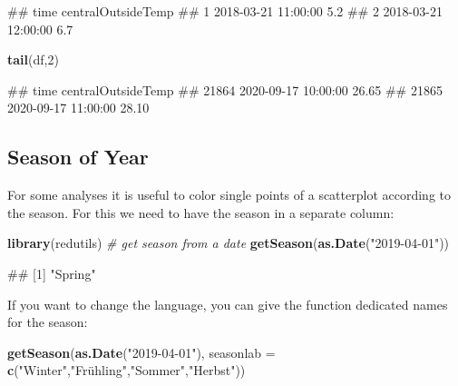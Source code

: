 \documentclass[
]{book}
\newenvironment{Shaded}{\begin{snugshade}}{\end{snugshade}}
\newcommand{\CommentTok}[1]{\textcolor[rgb]{0.56,0.35,0.01}{\textit{#1}}}
\newcommand{\DataTypeTok}[1]{\textcolor[rgb]{0.13,0.29,0.53}{#1}}
\newcommand{\DecValTok}[1]{\textcolor[rgb]{0.00,0.00,0.81}{#1}}
\newcommand{\KeywordTok}[1]{\textcolor[rgb]{0.13,0.29,0.53}{\textbf{#1}}}
\newcommand{\NormalTok}[1]{#1}
\newcommand{\StringTok}[1]{\textcolor[rgb]{0.31,0.60,0.02}{#1}}
\let\oldShaded\Shaded
\let\endoldShaded\endShaded
\renewenvironment{Shaded}{\footnotesize\oldShaded}{\endoldShaded}
\let\oldverbatim\verbatim
\let\endoldverbatim\endverbatim
\renewenvironment{verbatim}{\footnotesize\oldverbatim}{\endoldverbatim}
\begin{document}
\begin{verbatim}
##                  time centralOutsideTemp
## 1 2018-03-21 11:00:00                5.2
## 2 2018-03-21 12:00:00                6.7
\end{verbatim}

\begin{Shaded}
\begin{Highlighting}[]
\KeywordTok{tail}\NormalTok{(df,}\DecValTok{2}\NormalTok{)}
\end{Highlighting}
\end{Shaded}

\begin{verbatim}
##                      time centralOutsideTemp
## 21864 2020-09-17 10:00:00              26.65
## 21865 2020-09-17 11:00:00              28.10
\end{verbatim}

\hypertarget{season-of-year}{%
\subsection{Season of Year}\label{season-of-year}}

For some analyses it is useful to color single points of a scatterplot according to the season. For this we need to have the season in a separate column:

\begin{Shaded}
\begin{Highlighting}[]
\KeywordTok{library}\NormalTok{(redutils)}
\CommentTok{# get season from a date}
\KeywordTok{getSeason}\NormalTok{(}\KeywordTok{as.Date}\NormalTok{(}\StringTok{"2019-04-01"}\NormalTok{))}
\end{Highlighting}
\end{Shaded}

\begin{verbatim}
## [1] "Spring"
\end{verbatim}

If you want to change the language, you can give the function dedicated names for the season:

\begin{Shaded}
\begin{Highlighting}[]
\KeywordTok{getSeason}\NormalTok{(}\KeywordTok{as.Date}\NormalTok{(}\StringTok{"2019-04-01"}\NormalTok{),}
                  \DataTypeTok{seasonlab =} \KeywordTok{c}\NormalTok{(}\StringTok{"Winter"}\NormalTok{,}\StringTok{"Frühling","}\NormalTok{Sommer}\StringTok{","}\NormalTok{Herbst}\StringTok{"))}
\end{Highlighting}
\end{Shaded}
\end{document}

